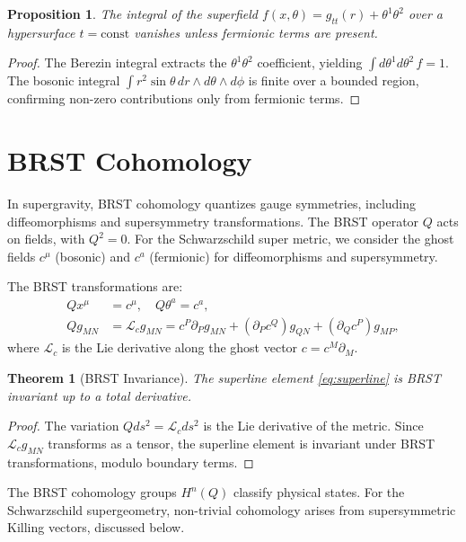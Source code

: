 \documentclass[12pt]{article}
\theoremstyle{plain}
\newtheorem{theorem}{Theorem}
\newtheorem{proposition}{Proposition}
\newcommand{\superline}{ds^{2}}
\newcommand{\lie}[1]{\mathcal{L}_{#1}}
\begin{document}
\begin{proposition}
The integral of the superfield $f(x, \theta) = g_{tt}(r) + \theta^{1} \theta^{2}$ over a hypersurface $t = \text{const}$ vanishes unless fermionic terms are present.
\end{proposition}

\begin{proof}
The Berezin integral extracts the $\theta^{1} \theta^{2}$ coefficient, yielding $\int d\theta^{1} d\theta^{2} \, f = 1$. The bosonic integral $\int r^{2} \sin\theta \, dr \wedge d\theta \wedge d\phi$ is finite over a bounded region, confirming non-zero contributions only from fermionic terms.
\end{proof}

\section{BRST Cohomology}

In supergravity, BRST cohomology quantizes gauge symmetries, including diffeomorphisms and supersymmetry transformations. The BRST operator $Q$ acts on fields, with $Q^{2} = 0$. For the Schwarzschild super metric, we consider the ghost fields $c^{\mu}$ (bosonic) and $c^{a}$ (fermionic) for diffeomorphisms and supersymmetry.

The BRST transformations are:
\begin{align}
Q x^{\mu} &= c^{\mu}, \quad Q \theta^{a} = c^{a}, \\
Q g_{MN} &= \lie{c} g_{MN} = c^{P} \partial_{P} g_{MN} + (\partial_{P} c^{Q}) g_{QN} + (\partial_{Q} c^{P}) g_{MP},
\end{align}
where $\lie{c}$ is the Lie derivative along the ghost vector $c = c^{M} \partial_{M}$.

\begin{theorem}[BRST Invariance]
The superline element \eqref{eq:superline} is BRST invariant up to a total derivative.
\end{theorem}

\begin{proof}
The variation $Q \superline = \lie{c} \superline$ is the Lie derivative of the metric. Since $\lie{c} g_{MN}$ transforms as a tensor, the superline element is invariant under BRST transformations, modulo boundary terms.
\end{proof}

The BRST cohomology groups $H^{n}(Q)$ classify physical states. For the Schwarzschild supergeometry, non-trivial cohomology arises from supersymmetric Killing vectors, discussed below.
\end{document}
